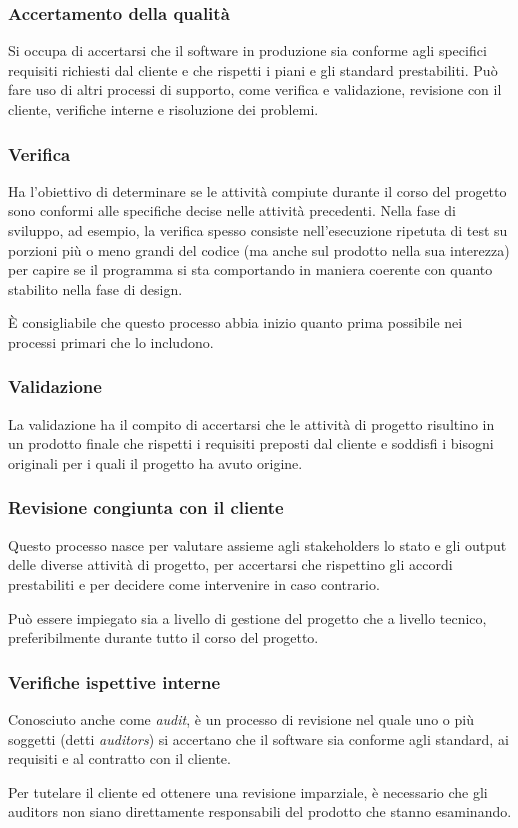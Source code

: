 \subsubsection{Accertamento della qualità}
Si occupa di accertarsi che il software in produzione sia conforme agli specifici requisiti richiesti dal cliente e che rispetti i piani e gli standard prestabiliti. Può fare uso di altri processi di supporto, come verifica e validazione, revisione con il cliente, verifiche interne e risoluzione dei problemi.
\subsubsection{Verifica}
Ha l'obiettivo di determinare se le attività compiute durante il corso del progetto sono conformi alle specifiche decise nelle attività precedenti. Nella fase di sviluppo, ad esempio, la verifica spesso consiste nell'esecuzione ripetuta di test su porzioni più o meno grandi del codice (ma anche sul prodotto nella sua interezza) per capire se il programma si sta comportando in maniera coerente con quanto stabilito nella fase di design.
\par È consigliabile che questo processo abbia inizio quanto prima possibile nei processi primari che lo includono.
\subsubsection{Validazione}
La validazione ha il compito di accertarsi che le attività di progetto risultino in un prodotto finale che rispetti i requisiti preposti dal cliente e soddisfi i bisogni originali per i quali il progetto ha avuto origine.
\subsubsection{Revisione congiunta con il cliente}
Questo processo nasce per valutare assieme agli stakeholders lo stato e gli output delle diverse attività di progetto, per accertarsi che rispettino gli accordi prestabiliti e per decidere come intervenire in caso contrario.
\par Può essere impiegato sia a livello di gestione del progetto che a livello tecnico, preferibilmente durante tutto il corso del progetto.
\subsubsection{Verifiche ispettive interne}
Conosciuto anche come \textit{audit}, è un processo di revisione nel quale uno o più soggetti (detti \textit{auditors}) si accertano che il software sia conforme agli standard, ai requisiti e al contratto con il cliente.
\par Per tutelare il cliente ed ottenere una revisione imparziale, è necessario che gli auditors non siano direttamente responsabili del prodotto che stanno esaminando.

